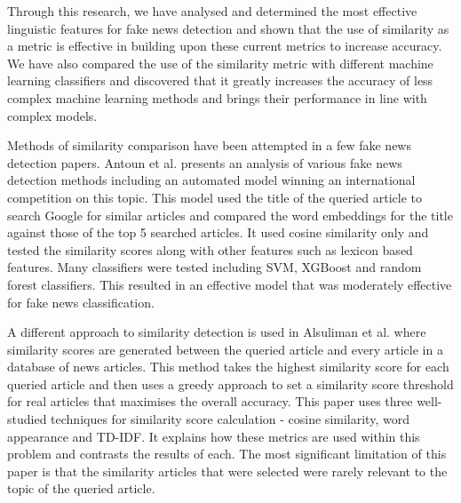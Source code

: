 \documentclass{article}
\begin{document}
Through this research, we have analysed and determined the most effective linguistic features for fake news detection and shown that the use of similarity as a metric is effective in building upon these current metrics to increase accuracy. We have also compared the use of the similarity metric with different machine learning classifiers and discovered that it greatly increases the accuracy of less complex machine learning methods and brings their performance in line with complex models.


\label{section:related_work}

Methods of similarity comparison have been attempted in a few fake news detection papers. Antoun et al. \cite{antoun2020state}
presents an analysis of various fake news detection methods including an automated model winning an international competition on this topic. This model used the title of the queried article to search Google for similar articles and compared the word embeddings for the title against those of the top 5 searched articles. It used cosine similarity only and tested the similarity scores along with other features such as lexicon based features. Many classifiers were tested including SVM, XGBoost and random forest classifiers. This resulted in an effective model that was moderately effective for fake news classification.

A different approach to similarity detection is used in Alsuliman et al. \cite{alsuliman2022social} where similarity scores are generated between the queried article and every article in a database of news articles. This method takes the highest similarity score for each queried article and then uses a greedy approach to set a similarity score threshold for real articles that maximises the overall accuracy. This paper uses three well-studied techniques for similarity score calculation - cosine similarity, word appearance and TD-IDF. It explains how these metrics are used within this problem and contrasts the results of each. The most significant limitation of this paper is that the similarity articles that were selected were rarely relevant to the topic of the queried article.
\end{document}
